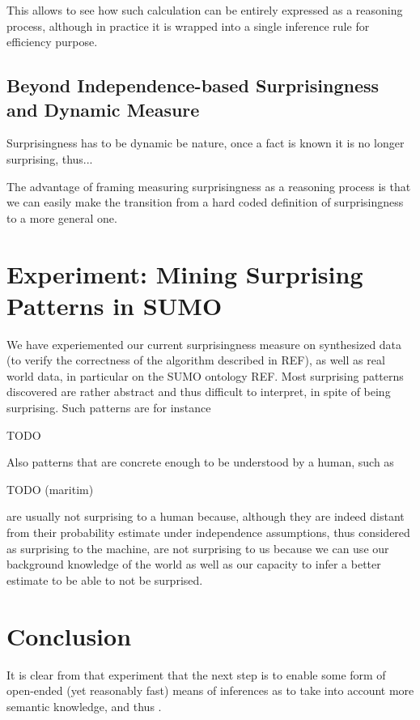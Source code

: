 \documentclass[runningheads]{llncs}
\begin{document}
This allows to see how such calculation can be entirely expressed as a
reasoning process, although in practice it is wrapped into a single
inference rule for efficiency purpose.

\subsection{Beyond Independence-based Surprisingness and Dynamic Measure}

Surprisingness has to be dynamic be nature, once a fact is known it is
no longer surprising, thus...

The advantage of framing measuring surprisingness as a reasoning
process is that we can easily make the transition from a hard coded
definition of surprisingness to a more general one. 

\section{Experiment: Mining Surprising Patterns in SUMO}

We have experiemented our current surprisingness measure on
synthesized data (to verify the correctness of the algorithm described
in REF), as well as real world data, in particular on the SUMO
ontology REF. Most surprising patterns discovered are rather abstract
and thus difficult to interpret, in spite of being surprising. Such
patterns are for instance

TODO

Also patterns that are concrete enough to be understood by a human,
such as

TODO (maritim)

are usually not surprising to a human because, although they are
indeed distant from their probability estimate under independence
assumptions, thus considered as surprising to the machine, are not
surprising to us because we can use our background knowledge of the
world as well as our capacity to infer a better estimate to be able to
not be surprised.

\section{Conclusion}

It is clear from that experiment that the next step is to enable some
form of open-ended (yet reasonably fast) means of inferences as to
take into account more semantic knowledge, and thus .

%
%


\end{document}
